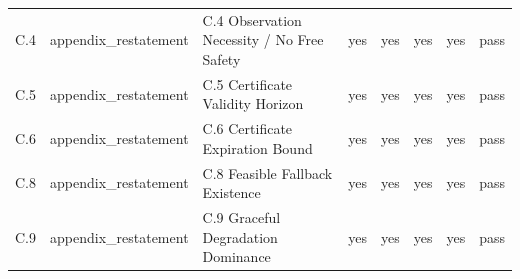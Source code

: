 \begin{small}
\begin{longtable}{@{}p{1.3cm}p{2.3cm}p{4.1cm}p{1.4cm}p{1.4cm}p{1.4cm}p{1.4cm}p{1.8cm}@{}}
C.4 & appendix\_\allowbreak restatement & C.4 Observation Necessity / No Free Safety & yes & yes & yes & yes & pass \\
C.5 & appendix\_\allowbreak restatement & C.5 Certificate Validity Horizon & yes & yes & yes & yes & pass \\
C.6 & appendix\_\allowbreak restatement & C.6 Certificate Expiration Bound & yes & yes & yes & yes & pass \\
C.8 & appendix\_\allowbreak restatement & C.8 Feasible Fallback Existence & yes & yes & yes & yes & pass \\
C.9 & appendix\_\allowbreak restatement & C.9 Graceful Degradation Dominance & yes & yes & yes & yes & pass \\
\end{longtable}
\end{small}
